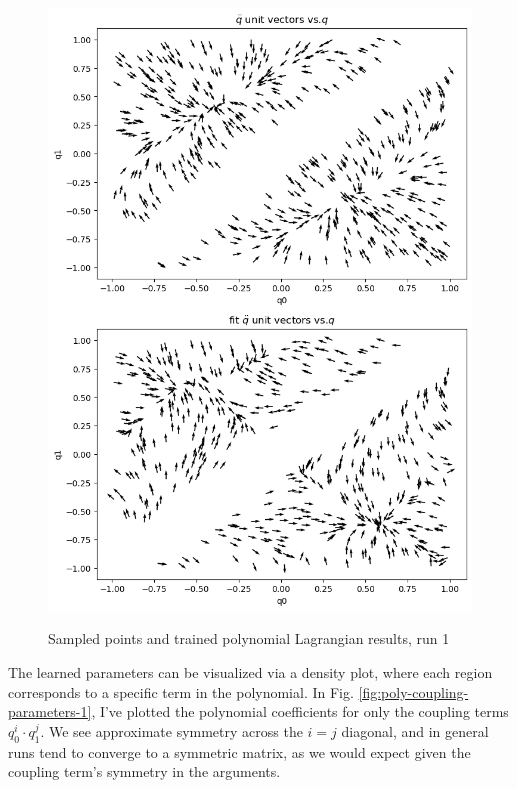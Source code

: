 \documentclass[]{article}
\begin{document}
\begin{figure}[H]
	\caption{Sampled points and trained polynomial Lagrangian results, run 1}
	\centering
	\includegraphics[scale=0.60]{poly-fit-1.png}
	\label{fig:poly-fit-1}
\end{figure}

The learned parameters can be visualized via a density plot, where each region corresponds to a specific term in the polynomial. In Fig. \ref{fig:poly-coupling-parameters-1}, I've plotted the polynomial coefficients for only the coupling terms $q_0^i \cdot q_1^j$. We see approximate symmetry across the $i=j$ diagonal, and in general runs tend to converge to a symmetric matrix, as we would expect given the coupling term's symmetry in the arguments.
\end{document}
